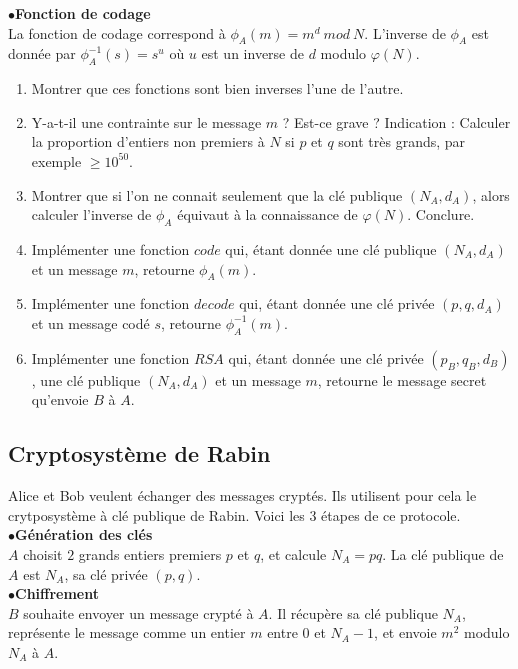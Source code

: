 $\bullet$\textbf{Fonction de codage}\\
La fonction de codage correspond à $\phi_A(m)= m^d \ mod\ N$. L'inverse de $\phi_A$ est donnée par $\phi_A^{-1}(s)=s^u$ où $u$ est un inverse de $d$ modulo $\varphi(N)$.\\

\begin{enumerate}
\item Montrer que ces fonctions sont bien inverses l'une de l'autre.
\item Y-a-t-il une contrainte sur le message $m$ ? Est-ce grave ? Indication : Calculer la proportion d'entiers non premiers à $N$ si $p$ et $q$ sont très grands, par exemple $\geq 10^{50}$.
\item Montrer que si l'on ne connait seulement que la clé publique $(N_A,d_A)$, alors calculer l'inverse de $\phi_A$ équivaut à la connaissance de $\varphi(N)$. Conclure.
\item Implémenter une fonction $code$ qui, étant donnée une clé publique $(N_A,d_A)$ et un message $m$, retourne $\phi_A(m)$.  
\item Implémenter une fonction $decode$ qui, étant donnée une clé privée $(p,q,d_A)$ et un message codé $s$, retourne $\phi_A^{-1}(m)$.  
\item Implémenter une fonction $RSA$ qui, étant donnée une clé privée $(p_B,q_B,d_B)$, une clé publique $(N_A,d_A)$ et un message $m$, retourne le message secret qu'envoie $B$ à $A$. 
\end{enumerate} 
 
\subsection{Cryptosystème de Rabin}

Alice et Bob veulent échanger des messages cryptés. Ils utilisent pour cela le crytposystème à clé publique de Rabin. Voici les $3$ étapes de ce protocole.\\

$\bullet$\textbf{Génération des clés}\\
$A$ choisit $2$ grands entiers premiers $p$ et $q$, et calcule $N_A=pq$. La clé publique de $A$ est $N_A$, sa clé privée $(p,q)$.  \\

$\bullet$\textbf{Chiffrement}\\
$B$ souhaite envoyer un message crypté à $A$. Il récupère sa clé publique $N_A$, représente le message comme un entier $m$ entre $0$ et $N_A-1$, et envoie $m^2 $ modulo $N_A$ à $A$.\\

